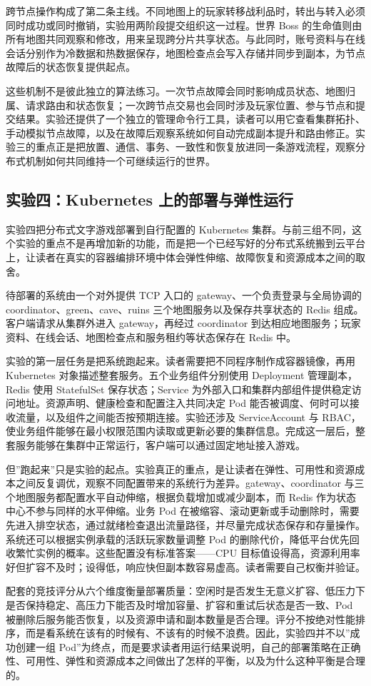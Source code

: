 跨节点操作构成了第二条主线。不同地图上的玩家转移战利品时，转出与转入必须同时成功或同时撤销，实验用两阶段提交组织这一过程。世界 Boss 的生命值则由所有地图共同观察和修改，用来呈现跨分片共享状态。与此同时，账号资料与在线会话分别作为冷数据和热数据保存，地图检查点会写入存储并同步到副本，为节点故障后的状态恢复提供起点。

这些机制不是彼此独立的算法练习。一次节点故障会同时影响成员状态、地图归属、请求路由和状态恢复；一次跨节点交易也会同时涉及玩家位置、参与节点和提交结果。实验还提供了一个独立的管理命令行工具，读者可以用它查看集群拓扑、手动模拟节点故障，以及在故障后观察系统如何自动完成副本提升和路由修正。实验三的重点正是把放置、通信、事务、一致性和恢复放进同一条游戏流程，观察分布式机制如何共同维持一个可继续运行的世界。

\subsection{实验四：Kubernetes 上的部署与弹性运行}
\label{sec:appendix-lab4}

实验四把分布式文字游戏部署到自行配置的 Kubernetes 集群。与前三组不同，这个实验的重点不是再增加新的功能，而是把一个已经写好的分布式系统搬到云平台上，让读者在真实的容器编排环境中体会弹性伸缩、故障恢复和资源成本之间的取舍。

待部署的系统由一个对外提供 TCP 入口的 gateway、一个负责登录与全局协调的 coordinator、green、cave、ruins 三个地图服务以及保存共享状态的 Redis 组成。客户端请求从集群外进入 gateway，再经过 coordinator 到达相应地图服务；玩家资料、在线会话、地图检查点和服务租约等状态保存在 Redis 中。

实验的第一层任务是把系统跑起来。读者需要把不同程序制作成容器镜像，再用 Kubernetes 对象描述整套服务。五个业务组件分别使用 Deployment 管理副本，Redis 使用 StatefulSet 保存状态；Service 为外部入口和集群内部组件提供稳定访问地址。资源声明、健康检查和配置注入共同决定 Pod 能否被调度、何时可以接收流量，以及组件之间能否按预期连接。实验还涉及 ServiceAccount 与 RBAC，使业务组件能够在最小权限范围内读取或更新必要的集群信息。完成这一层后，整套服务能够在集群中正常运行，客户端可以通过固定地址接入游戏。

但”跑起来”只是实验的起点。实验真正的重点，是让读者在弹性、可用性和资源成本之间反复调优，观察不同配置带来的系统行为差异。gateway、coordinator 与三个地图服务都配置水平自动伸缩，根据负载增加或减少副本，而 Redis 作为状态中心不参与同样的水平伸缩。业务 Pod 在被缩容、滚动更新或手动删除时，需要先进入排空状态，通过就绪检查退出流量路径，并尽量完成状态保存和存量操作。系统还可以根据实例承载的活跃玩家数量调整 Pod 的删除代价，降低平台优先回收繁忙实例的概率。这些配置没有标准答案——CPU 目标值设得高，资源利用率好但扩容不及时；设得低，响应快但副本数容易虚高。读者需要自己权衡并验证。

配套的竞技评分从六个维度衡量部署质量：空闲时是否发生无意义扩容、低压力下是否保持稳定、高压力下能否及时增加容量、扩容和重试后状态是否一致、Pod 被删除后服务能否恢复，以及资源申请和副本数量是否合理。评分不按绝对性能排序，而是看系统在该有的时候有、不该有的时候不浪费。因此，实验四并不以”成功创建一组 Pod”为终点，而是要求读者用运行结果说明，自己的部署策略在正确性、可用性、弹性和资源成本之间做出了怎样的平衡，以及为什么这种平衡是合理的。
